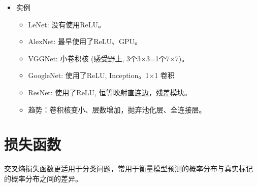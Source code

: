 \documentclass[
12pt, %
a4paper, 
oneside, %
headinclude,footinclude, %
]{scrartcl}
\begin{document}
\begin{itemize}
    \item 实例
    \begin{itemize}
        \item LeNet: 没有使用ReLU。
        \item AlexNet: 最早使用了ReLU、GPU。
        \item VGGNet: 小卷积核 (感受野上, 3个3×3=1个7×7)。
        \item GoogleNet: 使用了ReLU, Inception。1×1 卷积
        \item ResNet: 使用了ReLU, 恒等映射直连边，残差模块。
        \item 趋势：卷积核变小、层数增加，抛弃池化层、全连接层。
    \end{itemize}
\end{itemize}

\section{损失函数}
交叉熵损失函数更适用于分类问题，常用于衡量模型预测的概率分布与真实标记
的概率分布之间的差异。
\end{document}
